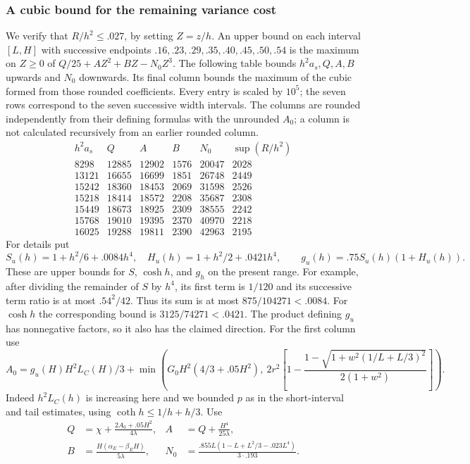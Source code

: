 \subsubsection{A cubic bound for the remaining variance cost}
We verify that $R/h^2\le .027$, by setting $Z=z/h$. An upper bound on each interval $[L,H]$ with successive endpoints $.16,.23,.29,.35,.40,.45,.50,.54$ is the maximum on $Z\ge0$ of $Q/25+A Z^2+B Z-N_0 Z^3$. The following table bounds $h^2a_s,Q,A,B$ upwards and $N_0$ downwards. Its final column bounds the maximum of the cubic formed from those rounded coefficients. Every entry is scaled by $10^5$; the seven rows correspond to the seven successive width intervals. The columns are rounded independently from their defining formulas with the unrounded $A_0$; a column is not calculated recursively from an earlier rounded column.
\[
\begin{array}{rrrrrr}
 h^2a_s&Q&A&B&N_0&\sup(R/h^2)\\\hline
8298&12885&12902&1576&20047&2028\\
13121&16655&16699&1851&26748&2449\\
15242&18360&18453&2069&31598&2526\\
15218&18414&18572&2208&35687&2308\\
15449&18673&18925&2309&38555&2242\\
15768&19010&19395&2370&40970&2218\\
16025&19288&19811&2390&42963&2195
\end{array}
\]
For details put
\[
 S_u(h)=1+h^2/6+.0084h^4,\quad H_u(h)=1+h^2/2+.0421h^4,\qquad
 g_u(h)=.75 S_u(h)(1+H_u(h)).
\]
These are upper bounds for $S$, $\cosh h$, and $g_h$ on the present range. For example, after dividing the remainder of $S$ by $h^4$, its first term is $1/120$ and its successive term ratio is at most $.54^2/42$. Thus its sum is at most $875/104271<.0084$. For $\cosh h$ the corresponding bound is $3125/74271<.0421$. The product defining $g_u$ has nonnegative factors, so it also has the claimed direction. For the first column use
\[
 A_0=g_u(H)H^2L_C(H)/3+
 \min\left(G_0 H^2(4/3+.05H^2),\ 2r^2\left[1-\frac{1-\sqrt{1+w^2(1/L+L/3)^2}}{2(1+w^2)}\right]\right).
\]
Indeed $h^2L_C(h)$ is increasing here and we bounded $p$ as in the short-interval and tail estimates, using $\coth h\le1/h+h/3$. Use
\[
\begin{aligned}
 Q&=\chi+\frac{2A_0+.05H^2}{4\lambda},&
 A&=Q+\frac{H^4}{25\lambda},\\
 B&=\frac{H(\alpha_E-\beta_EH)}{5\lambda},&
 N_0&=\frac{.855L(1-L+L^2/3-.023L^4)}{3\cdot.193}.
\end{aligned}
\]
